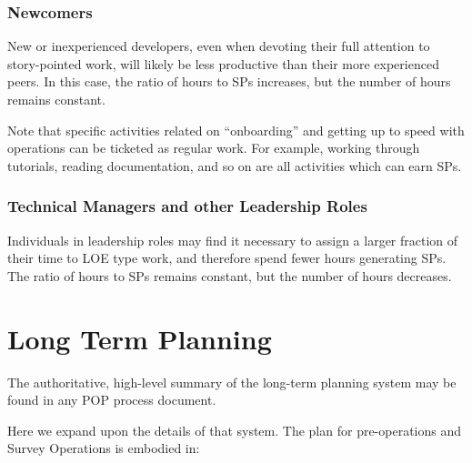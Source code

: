 \subsubsection{Newcomers}
\label{sec:newcomers}

New or inexperienced developers, even when devoting their full attention to \gls{story}-pointed work, will likely be less productive than their more experienced peers.
In this case, the ratio of hours to \glspl{SP} increases, but the number of hours remains constant.

Note that specific activities related on ``onboarding'' and getting up to speed with operations can be ticketed as regular work.
For example, working through tutorials, reading documentation, and so on are all activities which can earn \glspl{SP}.

\subsubsection{Technical Managers and other Leadership Roles}

Individuals in leadership roles may find it necessary to assign a larger fraction of their time to \gls{LOE} type work, and therefore spend fewer hours generating \glspl{SP}.
The ratio of hours to \glspl{SP} remains constant, but the number of hours decreases.


\section{Long Term Planning}
\label{sec:long-term-plan}

The authoritative, high-level summary of the long-term planning system may be found in any POP process document.

Here we expand upon the details of that system.
The plan for pre-operations and Survey Operations is embodied in:

